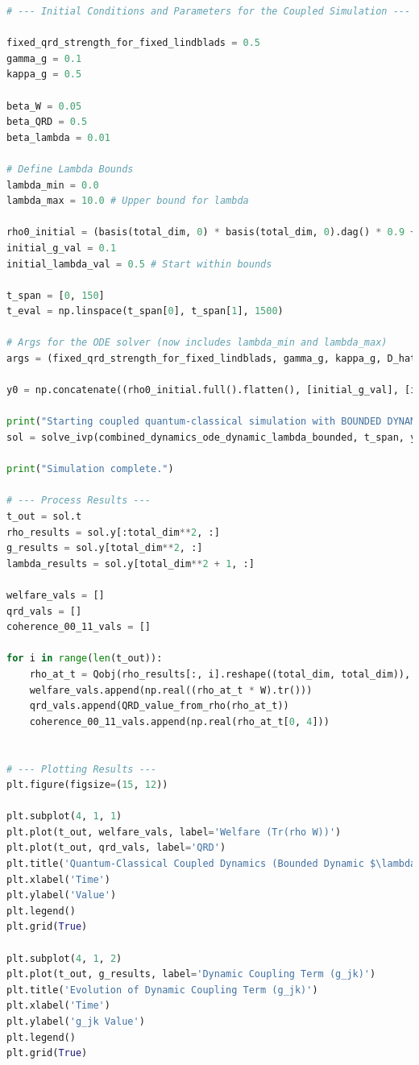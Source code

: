 \documentclass[9pt]{article}
\begin{document}
\begin{lstlisting}[language=Python, basicstyle=\ttfamily\footnotesize, breaklines=true, frame=single, caption={Python Code for Quantum-Classical Coupled with bounded Dynamics}, label={lst:qrd_code}]
# --- Initial Conditions and Parameters for the Coupled Simulation ---

fixed_qrd_strength_for_fixed_lindblads = 0.5
gamma_g = 0.1
kappa_g = 0.5

beta_W = 0.05
beta_QRD = 0.5
beta_lambda = 0.01

# Define Lambda Bounds
lambda_min = 0.0
lambda_max = 10.0 # Upper bound for lambda

rho0_initial = (basis(total_dim, 0) * basis(total_dim, 0).dag() * 0.9 + (identity(total_dim) * 0.1 / total_dim)).unit()
initial_g_val = 0.1
initial_lambda_val = 0.5 # Start within bounds

t_span = [0, 150]
t_eval = np.linspace(t_span[0], t_span[1], 1500)

# Args for the ODE solver (now includes lambda_min and lambda_max)
args = (fixed_qrd_strength_for_fixed_lindblads, gamma_g, kappa_g, D_hat_example, V_operator, beta_W, beta_QRD, beta_lambda, lambda_min, lambda_max)

y0 = np.concatenate((rho0_initial.full().flatten(), [initial_g_val], [initial_lambda_val]))

print("Starting coupled quantum-classical simulation with BOUNDED DYNAMIC LAMBDA...")
sol = solve_ivp(combined_dynamics_ode_dynamic_lambda_bounded, t_span, y0, args=args, t_eval=t_eval, method='RK45', rtol=1e-6, atol=1e-8)

print("Simulation complete.")

# --- Process Results ---
t_out = sol.t
rho_results = sol.y[:total_dim**2, :]
g_results = sol.y[total_dim**2, :]
lambda_results = sol.y[total_dim**2 + 1, :]

welfare_vals = []
qrd_vals = []
coherence_00_11_vals = []

for i in range(len(t_out)):
    rho_at_t = Qobj(rho_results[:, i].reshape((total_dim, total_dim)), dims=[Ns, Ns])
    welfare_vals.append(np.real((rho_at_t * W).tr()))
    qrd_vals.append(QRD_value_from_rho(rho_at_t))
    coherence_00_11_vals.append(np.real(rho_at_t[0, 4]))


# --- Plotting Results ---
plt.figure(figsize=(15, 12))

plt.subplot(4, 1, 1)
plt.plot(t_out, welfare_vals, label='Welfare (Tr(rho W))')
plt.plot(t_out, qrd_vals, label='QRD')
plt.title('Quantum-Classical Coupled Dynamics (Bounded Dynamic $\lambda$)')
plt.xlabel('Time')
plt.ylabel('Value')
plt.legend()
plt.grid(True)

plt.subplot(4, 1, 2)
plt.plot(t_out, g_results, label='Dynamic Coupling Term (g_jk)')
plt.title('Evolution of Dynamic Coupling Term (g_jk)')
plt.xlabel('Time')
plt.ylabel('g_jk Value')
plt.legend()
plt.grid(True)


\end{lstlisting}
\end{document}
